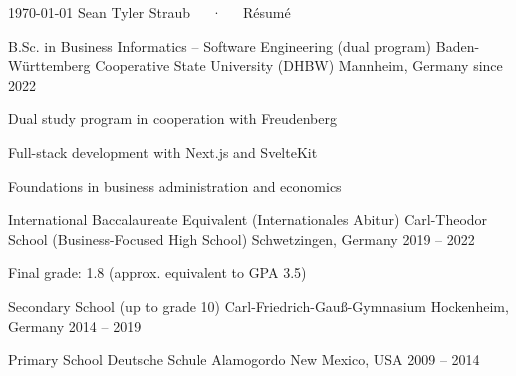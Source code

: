 \documentclass[11pt, a4paper]{awesome-cv}
\begin{document}
\makecvheader[C]

\makecvfooter
  {\today}
  {Sean Tyler Straub~~~·~~~Résumé}
  {\thepage}


\begin{cventries}

\cventry
  {B.Sc. in Business Informatics – Software Engineering (dual program)}
  {Baden-Württemberg Cooperative State University (DHBW)}
  {Mannheim, Germany}
  {since 2022}
  {
    \begin{cvitems}
      \item {Dual study program in cooperation with Freudenberg}
      \item {Full-stack development with Next.js and SvelteKit}
      \item {Foundations in business administration and economics}
    \end{cvitems}
  }

\cventry
  {International Baccalaureate Equivalent (Internationales Abitur)}
  {Carl-Theodor School (Business-Focused High School)}
  {Schwetzingen, Germany}
  {2019 -- 2022}
  {
    \begin{cvitems}
      \item {Final grade: 1.8 (approx. equivalent to GPA 3.5)}
    \end{cvitems}
  }

\cventry
  {Secondary School (up to grade 10)}
  {Carl-Friedrich-Gauß-Gymnasium}
  {Hockenheim, Germany}
  {2014 -- 2019}
  {}

\cventry
  {Primary School}
  {Deutsche Schule Alamogordo}
  {New Mexico, USA}
  {2009 -- 2014}
  {}

\end{cventries}

\end{document}

